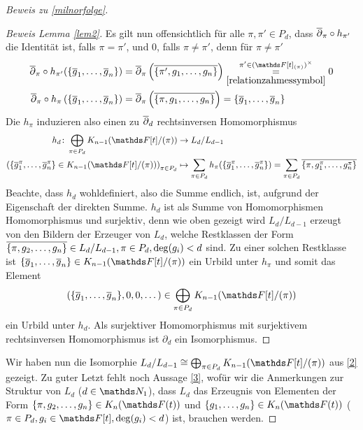 \documentclass[ngerman,fontsize=11pt, paper=a4, parskip=half, titlepage=true, toc=bib]{scrartcl}
\begin{document}
\begin{proof}[Beweis zu \ref{milnorfolge}]
\begin{proof}[Beweis Lemma \ref{lem2}]
    Es gilt nun offensichtlich für alle $\pi,\pi'\in P_d$, 
    dass $\overline\partial_\pi\circ h_{\pi'}$ die Identität ist, 
    falls $\pi=\pi'$, und $0$, falls $\pi\neq\pi'$,
    denn für $\pi\neq\pi'$
    \begin{align*}
      \ov\partial_\pi\circ h_{\pi'}(\{\ov g_1,\dotsc,\ov g_n\})
      &= \ov\partial_\pi\left( \ov{\{\pi', g_1,\dotsc, g_n\}} \right)
        \overset{\pi'\in(\F[t]_{(\pi)})^\times}{
        \underset{\ref{relationzahmessymbol}}{=}}
        0\\
      \ov\partial_\pi\circ h_{\pi}\left( \{\ov g_1,\dotsc,\ov g_n\} \right)
      &= \ov\partial_\pi\left( \ov{\{\pi, g_1,\dotsc, g_n\}} \right)
      = \{\ov g_1,\dotsc,\ov g_n\}
    \end{align*}
    Die $h_\pi$ induzieren also einen zu
    $\overline\partial_d$ rechtsinversen Homomorphismus
    \begin{align*}
      h_d\colon \bigoplus_{\pi\in P_d}\K_{n-1}(\Ftpi)
      &\to L_d/L_{d-1}\\
      \left(
      \{\ov g_1^\pi,\dotsc,\ov g_n^\pi\}\in\K_{n-1}(\Ftpi)
      \right)_{\pi\in P_d}
      &\mapsto 
        \sum_{\pi\in P_d} h_\pi(\{\ov g_1^\pi,\dotsc,\ov g_n^\pi\}) 
        = \sum_{\pi\in P_d} \ov{\{\pi, g_1^\pi,\dotsc,g_n^\pi\}}
    \end{align*}
    Beachte, dass $h_d$ wohldefiniert, also die Summe endlich, ist,
    aufgrund der Eigenschaft der direkten Summe.
    $h_d$ ist als Summe von Homomorphismen Homomorphismus und
    surjektiv, denn wie oben gezeigt wird $L_d/L_{d-1}$ erzeugt von
    den Bildern der Erzeuger von $L_d$, welche Restklassen der Form 
    $\overline{\{\pi,g_2,\dotsc,g_n\}}\in L_d/L_{d-1}, \pi\in
    P_d,\deg(g_i)<d$ sind.
    Zu einer solchen Restklasse ist $\{\ov g_1,\dotsc,\ov
    g_n\}\in\K_{n-1}(\Ftpi)$ ein Urbild unter $h_\pi$
    und somit das Element
    \begin{gather*}
      \left(
      \{\ov g_1,\dotsc,\ov g_n\},%
      0, 0,\dotsc %
      \right)%
      \in \bigoplus_{\pi\in P_d}\K_{n-1}(\Ftpi)
    \end{gather*}
    ein Urbild unter $h_d$.
    Als surjektiver Homomorphismus mit surjektivem
    rechtsinversen Homomorphismus ist $\partial_d$ ein Isomorphismus.
  \end{proof}

  Wir haben nun die Isomorphie $L_d/L_{d-1}\cong \bigoplus_{\pi\in
    P_d}\K_{n-1}(\Ftpi)$ aus \eqref{2} gezeigt.
  Zu guter Letzt fehlt noch Aussage \eqref{3}, wofür wir die Anmerkungen
  zur Struktur von $L_d$ ($d\in\N_1$), dass $L_d$ das Erzeugnis von
  Elementen der Form
  $\{\pi,g_2,\dotsc,g_n\}\in\KnFt$ und $\{g_1,\dotsc,g_n\}\in\KnFt$
  ($\pi\in P_d,g_i\in\F[t],\deg(g_i)<d$) ist,
  brauchen werden.


\end{proof}
\end{document}

